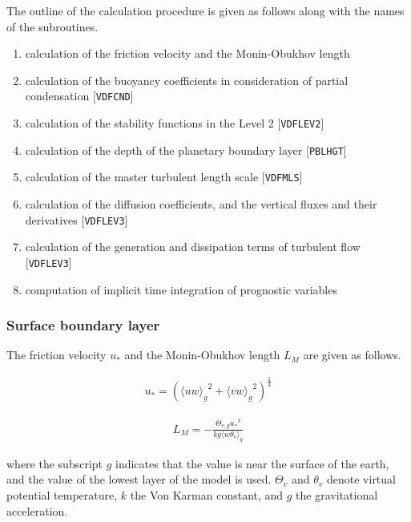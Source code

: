 The outline of the calculation procedure is given as follows along with
the names of the subroutines.

\begin{enumerate}
\def\labelenumi{\arabic{enumi}.}
\tightlist
\item
  calculation of the friction velocity and the Monin-Obukhov length
\item
  calculation of the buoyancy coefficients in consideration of partial
  condensation {[}\texttt{VDFCND}{]}
\item
  calculation of the stability functions in the Level 2
  {[}\texttt{VDFLEV2}{]}
\item
  calculation of the depth of the planetary boundary layer
  {[}\texttt{PBLHGT}{]}
\item
  calculation of the master turbulent length scale {[}\texttt{VDFMLS}{]}
\item
  calculation of the diffusion coefficients, and the vertical fluxes and
  their derivatives {[}\texttt{VDFLEV3}{]}
\item
  calculation of the generation and dissipation terms of turbulent flow
  {[}\texttt{VDFLEV3}{]}
\item
  computation of implicit time integration of prognostic variables
\end{enumerate}

\hypertarget{surface-boundary-layer}{%
\subsubsection{Surface boundary layer}\label{surface-boundary-layer}}

The friction velocity \(u_*\) and the Monin-Obukhov length \(L_M\) are
given as follows.

\begin{eqnarray}u_*=\left({\langle uw \rangle_g}^2+{\langle vw \rangle_g}^2 \right)^\frac{1}{4}\end{eqnarray}

\begin{eqnarray}L_M=-\frac{\Theta_{v,g} {u_*}^3}{kg \langle w\theta_v \rangle_g}\end{eqnarray}

where the subscript \(g\) indicates that the value is near the surface
of the earth, and the value of the lowest layer of the model is used.
\(\Theta_v\) and \(\theta_v\) denote virtual potential temperature,
\(k\) the Von Karman constant, and \(g\) the gravitational acceleration.


